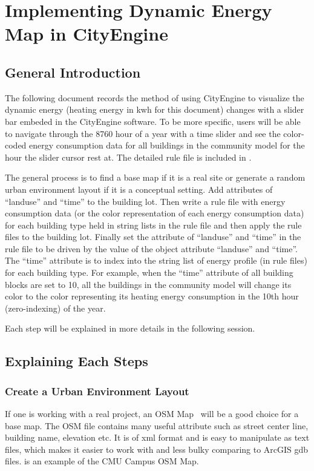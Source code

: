 \chapter{Implementing Dynamic Energy Map in
  CityEngine} %

\label{AppendixA} %

\section{General Introduction}
The following document records the method of using CityEngine to
visualize the dynamic energy (heating energy in kwh for this document)
changes with a slider bar embeded in the CityEngine software. To be
more specific, users will be able to navigate through the 8760 hour of
a year with a time slider and see the color-coded energy consumption
data for all buildings in the community model for the hour the slider
cursor rest at. The detailed rule file is included in .

The general process is to find a base map if it is a real site or
generate a random urban environment layout if it is a conceptual
setting. Add attributes of ``landuse'' and ``time'' to the building
lot. Then write a rule file with energy consumption data (or the color
representation of each energy consumption data) for each building type
held in string lists in the rule file and then apply the rule files to
the building lot. Finally set the attribute of ``landuse'' and
``time'' in the rule file to be driven by the value of the object
attribute ``landuse'' and ``time''. The ``time'' attribute is to index
into the string list of energy profile (in rule files) for each
building type. For example, when the ``time'' attribute of all building
blocks are set to 10, all the buildings in the community model will
change its color to the color representing its heating energy
consumption in the 10th hour (zero-indexing) of the year.

Each step will be explained in more details in the following session.
\section{Explaining Each Steps}
\subsection{Create a Urban Environment Layout}
If one is working with a real project, an OSM Map~\cite{OSM2015} will
be a good choice for a base map. The OSM file contains many useful
attribute such as street center line, building name, elevation etc. It
is of xml format and is easy to manipulate as text files, which makes
it easier to work with and less bulky comparing to ArcGIS gdb
files.  is an example of the CMU Campus OSM Map.

